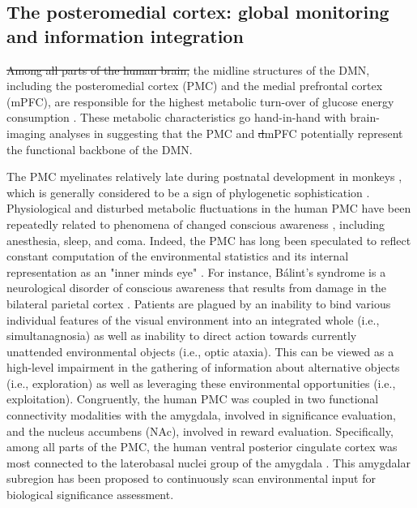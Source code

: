 \documentclass[10pt,letterpaper]{article}
\newcommand{\suggestremove}[1]{{\color{red} \sout{#1}}}
\begin{document}
\subsection{The posteromedial cortex: global monitoring and information integration}
\suggestremove{Among all parts of the human brain,}
the midline structures of the DMN,
including the posteromedial cortex (PMC) and
the medial prefrontal cortex (mPFC),
are responsible for the highest metabolic turn-over
of glucose energy consumption \citep{raichle2001pnas}.
These metabolic characteristics go hand-in-hand with
brain-imaging analyses \citep{andrews2010} in
suggesting that the PMC and \suggestremove{d}mPFC
potentially represent the functional backbone of the DMN.


The PMC myelinates relatively late during postnatal development in monkeys
\citep{goldman1987development}, which is generally considered to
be a sign of phylogenetic sophistication \citep{flechsig1920}.
Physiological and disturbed metabolic fluctuations in the
human PMC have been repeatedly related to
phenomena of changed conscious awareness \citep{cavanna2006precuneus},
including anesthesia, sleep, and coma.
%
Indeed,
the PMC has long been speculated to reflect constant computation of
the environmental statistics and its internal representation
as an "inner minds eye" \citep{cavanna2006precuneus, leech_pcc2014}.
For instance, B\'alint's syndrome is a neurological disorder of conscious
awareness that results from damage in the bilateral parietal cortex
\citep{balint1909seelenlahmung}.
Patients are plagued by an
inability to bind various individual features of the visual
environment into an integrated whole (i.e., simultanagnosia)
as well as inability to direct action towards
currently unattended environmental objects
(i.e., optic ataxia).
This can be viewed as a high-level impairment in the gathering
of information about alternative objects (i.e., exploration) as well as
leveraging these environmental opportunities (i.e., exploitation).
Congruently,
the human PMC was coupled in two functional connectivity modalities
with the amygdala, involved in significance evaluation, and
the nucleus accumbens (NAc), involved in reward evaluation.
Specifically, among all parts of the PMC,
the human ventral posterior cingulate cortex was
most connected to the laterobasal
nuclei group of the amygdala
\citep{bzdok2015subspecialization}.
This amygdalar subregion has been proposed to
continuously scan environmental input
for biological significance assessment.
\end{document}
